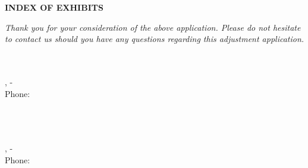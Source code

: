 \documentclass{letter}
\begin{document}
\begin{center}
\textbf{INDEX OF EXHIBITS}\\
\end{center}

\vspace{1.5cm}

\vfill

\textit{Thank you for your consideration of the above application. Please do not hesitate to contact us should you have any questions regarding this adjustment application.}

\begin{minipage}[t]{0.5\textwidth}

\vspace{2cm}
\textbf{\pApplicant} \\
\pAddress\\
\pCity, \pState - \pZip\\
Phone: \pPhone \\
\pEmail \\
\end{minipage}%
\begin{minipage}[t]{0.5\textwidth}
\vspace{2cm}
\begin{flushright}
\textbf{\dApplicant} \\
\dAddress\\
\dCity, \dState - \dZip\\
Phone: \dPhone \\
\dEmail\\
\end{flushright}
\end{minipage}





\end{document}
